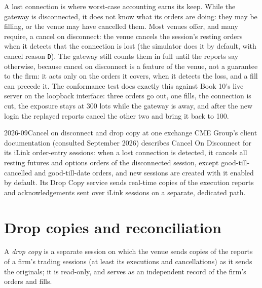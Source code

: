 \label{lst:ll:order-gateway-and-order-management:session}

A lost connection is where worst-case accounting earns its keep. While the gateway is disconnected, it does not know what its
orders are doing: they may be filling, or the venue may have cancelled them. Most venues offer, and many require, a cancel on
disconnect: the venue cancels the session's resting orders when it detects that the connection is lost (the simulator does it
by default, with cancel reason \texttt{D}). The gateway still counts them in full until the reports say otherwise, because
cancel on disconnect is a feature of the venue, not a guarantee to the firm: it acts only on the orders it covers, when it
detects the loss, and a fill can precede it. The conformance test does exactly this against Book 10's live server on the
loopback interface: three orders go out, one fills, the connection is cut, the exposure stays at 300 lots while the gateway is
away, and after the new login the replayed reports cancel the other two and bring it back to 100.

\begin{dated}{2026-09}{Cancel on disconnect and drop copy at one exchange}\label{dat:ll:order-gateway-and-order-management:cme}
CME Group's client documentation (consulted September 2026) describes Cancel On Disconnect for its iLink order-entry
sessions: when a lost connection is detected, it cancels all resting futures and options orders of the disconnected session,
except good-till-cancelled and good-till-date orders, and new sessions are created with it enabled by default. Its Drop Copy
service sends real-time copies of the execution reports and acknowledgements sent over iLink sessions on a separate,
dedicated path.
\end{dated}

\section{Drop copies and reconciliation}

\begin{definition}\label{def:ll:order-gateway-and-order-management:dropcopy}
A \emph{drop copy} is a separate session on which the venue sends copies of the reports of a firm's trading
sessions (at least its executions and cancellations) as it sends the originals; it is read-only, and serves as an independent
record of the firm's orders and fills.
\end{definition}

